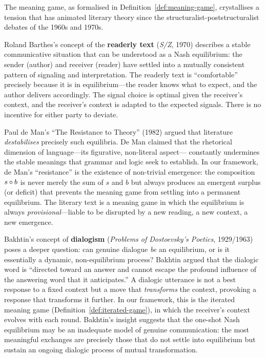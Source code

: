 \begin{interpretation}
\label{interp:ch14:barthes_de_man}
The meaning game, as formalised in Definition~\ref{def:meaning-game},
crystallises a tension that has animated literary theory since the
structuralist-poststructuralist debates of the 1960s and 1970s.

Roland Barthes's concept of the \textbf{readerly text} (\emph{S/Z}, 1970)
describes a stable communicative situation that can be understood as a Nash
equilibrium: the sender (author) and receiver (reader) have settled into a
mutually consistent pattern of signaling and interpretation.  The readerly
text is ``comfortable'' precisely because it is in equilibrium---the reader
knows what to expect, and the author delivers accordingly.  The signal
choice is optimal given the receiver's context, and the receiver's context
is adapted to the expected signals.  There is no incentive for either party
to deviate.

Paul de Man's ``The Resistance to Theory'' (1982) argued that literature
\emph{destabilises} precisely such equilibria.  De Man claimed that the
rhetorical dimension of language---its figurative, non-literal aspect---
constantly undermines the stable meanings that grammar and logic seek to
establish.  In our framework, de Man's ``resistance'' is the existence of
non-trivial emergence: the composition $s \circ b$ is never merely the
sum of $s$ and $b$ but always produces an emergent surplus (or deficit) that
prevents the meaning game from settling into a permanent equilibrium.  The
literary text is a meaning game in which the equilibrium is always
\emph{provisional}---liable to be disrupted by a new reading, a new context,
a new emergence.

Bakhtin's concept of \textbf{dialogism} (\emph{Problems of Dostoevsky's
Poetics}, 1929/1963) poses a deeper question: can genuine dialogue
\emph{be} an equilibrium, or is it essentially a dynamic, non-equilibrium
process?  Bakhtin argued that the dialogic word is ``directed toward an
answer and cannot escape the profound influence of the answering word that
it anticipates.''  A dialogic utterance is not a best response to a fixed
context but a move that \emph{transforms} the context, provoking a response
that transforms it further.  In our framework, this is the iterated meaning
game (Definition~\ref{def:iterated-game}), in which the receiver's context
evolves with each round.  Bakhtin's insight suggests that the one-shot Nash
equilibrium may be an inadequate model of genuine communication: the most
meaningful exchanges are precisely those that do not settle into equilibrium
but sustain an ongoing dialogic process of mutual transformation.
\end{interpretation}



